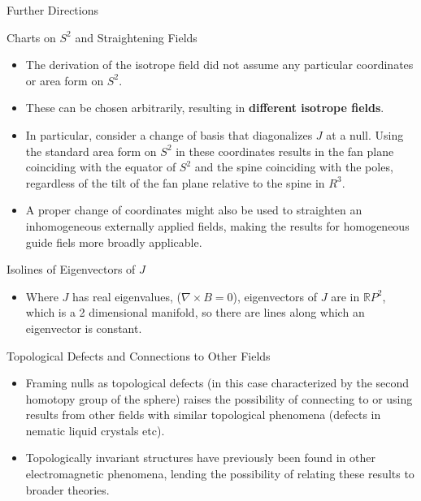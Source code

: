 \documentclass[final]{beamer}
\newlength{\onecolwid}
\begin{document}
\begin{frame}[t]
\begin{columns}[t]
\begin{column}{\onecolwid}
\begin{block}{\huge Further Directions}
  \begin{block}{Charts on $S^2$ and Straightening Fields}
    \begin{itemize}
      \item The derivation of the isotrope field did not assume
        any particular coordinates or area form on $S^2$.
      \item These can be chosen arbitrarily, resulting in \textbf{different isotrope fields}.
      \item In particular, consider a change of basis that diagonalizes $J$ at a null.
        Using the standard area form on $S^2$ in these coordinates results in the fan plane
        coinciding with the equator of $S^2$ and the spine coinciding with the poles,
        regardless of the tilt of the fan plane relative to the spine in $R^3$.
      \item A proper change of coordinates might also be used to straighten an
        inhomogeneous externally applied fields, making the results for
        homogeneous guide fiels more broadly applicable.
    \end{itemize}
  \end{block}

  \begin{block}{Isolines of Eigenvectors of $J$}
    \begin{itemize}
      \item Where $J$ has real eigenvalues, ($\nabla \times B=0$),
        eigenvectors of $J$ are in $\mathbb{R}P^2$, which is a 2 dimensional manifold,
        so there are lines along which an eigenvector is constant.
    \end{itemize}
  \end{block}

  \begin{block}{Topological Defects and Connections to Other Fields}
    \begin{itemize}
      \item Framing nulls as topological defects
        (in this case characterized by the second homotopy group of the sphere)
        raises the possibility of connecting to or using results from
        other fields with similar topological phenomena
        (defects in nematic liquid crystals\cite{alexander2012nematic} etc).
      \item Topologically invariant structures have previously been
        found in other electromagnetic phenomena, lending the possibility
        of relating these results to broader theories.\cite{thompson2014hopfions,ranada1992em}
    \end{itemize}
  \end{block}  


\end{block}
\end{column}
\end{columns}
\end{frame}
\end{document}
